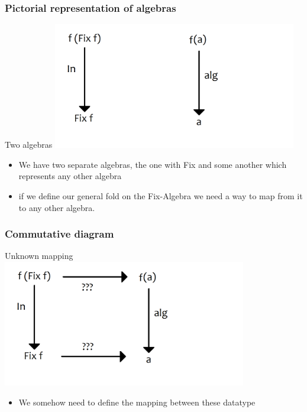 \documentclass[10pt]{beamer}
\begin{document}
\begin{frame}[fragile]
\frametitle{Pictorial representation of algebras}

\begin{block}{Two algebras}
\includegraphics[width=0.8\textwidth]{graf1.png}	
\end{block}
\begin{itemize}
\item We have two separate algebras, the one with Fix and some another which represents any other algebra
\item if we define our general fold on the Fix-Algebra we need a way to map from it to any other algebra.	
\end{itemize}

\end{frame}






\begin{frame}[fragile]
\frametitle{Commutative diagram}

\begin{block}{Unknown mapping}
\includegraphics[width=0.8\textwidth]{graf2.png}	
\end{block}
\begin{itemize}
\item We somehow need to define the mapping between these datatype
\end{itemize}

\end{frame}
\end{document}
